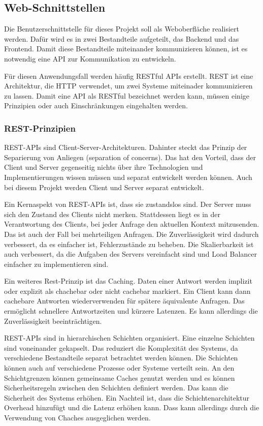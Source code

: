 \subsection{Web-Schnittstellen}
Die Benutzerschnittstelle für dieses Projekt soll als Weboberfläche realisiert werden. Dafür wird es in zwei Bestandteile aufgeteilt, das Backend und das Frontend. Damit diese Bestandteile miteinander kommunizieren können, ist es notwendig eine \ac{API} zur Kommunikation zu entwickeln.

Für diesen Anwendungsfall werden häufig \ac{REST}ful APIs erstellt. \ac{REST} ist eine Architektur, die HTTP verwendet, um zwei Systeme miteinader kommunizieren zu lassen. Damit eine API als \ac{REST}ful bezeichnet werden kann, müssen einige Prinzipien oder auch Einschränkungen eingehalten werden.

\subsubsection{REST-Prinzipien}

REST-APIs sind Client-Server-Architekturen. Dahinter steckt das Prinzip der Separierung von Anliegen (separation of concerns). Das hat den Vorteil, dass der Client und Server gegenseitig nichts über ihre Technologien und Implementierungen wissen müssen und separat entwickelt werden können. Auch bei diesem Projekt werden Client und Server separat entwickelt.

Ein Kernaspekt von REST-APIs ist, dass sie zustandslos sind. Der Server muss sich den Zustand des Clients nicht merken. Stattdessen liegt es in der Verantwortung des Clients, bei jeder Anfrage den aktuellen Kontext mitzusenden. Das ist auch der Fall bei mehrteiligen Anfragen. Die Zuverlässigkeit wird dadurch verbessert, da es einfacher ist, Fehlerzustände zu beheben. Die Skalierbarkeit ist auch verbessert, da die Aufgaben des Servers vereinfacht sind und Load Balancer einfacher zu implementieren sind.

Ein weiteres Rest-Prinzip ist das Caching. Daten einer Antwort werden implizit oder explizit als chachebar oder nicht cachebar markiert. Ein Client kann dann cachebare Antworten wiederverwenden für spätere äquivalente Anfragen. Das ermöglicht schnellere Antwortzeiten und kürzere Latenzen. Es kann allerdings die Zuverlässigkeit beeinträchtigen.

REST-APIs sind in hierarchischen Schichten organisiert. Eine einzelne Schichten sind voneinander gekapselt. Das reduziert die Komplexität des Systems, da verschiedene Bestandteile separat betrachtet werden können. Die Schichten können auch auf verschiedene Prozesse oder Systeme verteilt sein. An den Schichtgrenzen können gemeinsame Caches genutzt werden und es können Sicherheitsregeln zwischen den Schichten definiert werden. Das kann die Sicherheit des Systems erhöhen. Ein Nachteil ist, dass die Schichtenarchitektur Overhead hinzufügt und die Latenz erhöhen kann. Dass kann allerdings durch die Verwendung von Chaches ausgeglichen werden.

